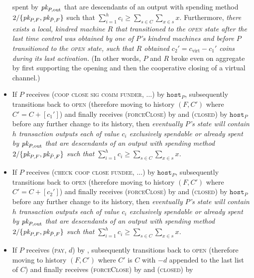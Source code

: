 \begin{itemize}
{    spent by $\textit{pk}_{P, \mathrm{out}}$ that are descendants of an output with
    spending method $2/\{\textit{pk}_{P, F}, \textit{pk}_{\bar{P}, F}\}$ such that
    $\sum\limits_{i=1}^h c_i \geq \sum\limits_{s \in C} \sum\limits_{x \in s}
    x$.} Furthermore, \emph{there exists a local, kindred machine $R$ that
    transitioned to the \textsc{open} state after the last time control was
    obtained by one of $P$'s kindred machines and before $P$ transitioned to the
    \textsc{open} state, such that $R$ obtained $c_2' = c_{\mathrm{virt}} -
    c_1'$ coins during its last activation.} (In other words, $P$ and $R$ broke
    even on aggregate by first supporting the opening and then the cooperative
    closing of a virtual channel.)
    \item If $P$ receives (\textsc{coop close sig comm funder}, $\dots$) by
    $\texttt{host}_P$, subsequently transitions back to \textsc{open} (therefore
    moving to history $(F, C')$ where $C' = C + [c_1']$) and finally receives
    (\textsc{forceClose}) by \environment and (\textsc{closed}) by
    $\texttt{host}_P$ before any further change to its history, then
    \emph{eventually $P$'s \ledger state will contain $h$ transaction outputs
    each of value $c_i$ exclusively spendable or already spent by $\textit{pk}_{P,
    \mathrm{out}}$ that are descendants of an output with spending method
    $2/\{\textit{pk}_{P, F}, \textit{pk}_{\bar{P}, F}\}$ such that $\sum\limits_{i=1}^h c_i \geq
    \sum\limits_{s \in C} \sum\limits_{x \in s} x$.}
    \item If $P$ receives (\textsc{check coop close fundee}, $\dots$) by
    $\texttt{host}_P$, subsequently transitions back to \textsc{open} (therefore
    moving to history $(F, C')$ where $C' = C + [c_2']$) and finally receives
    (\textsc{forceClose}) by \environment and (\textsc{closed}) by
    $\texttt{host}_P$ before any further change to its history, then
    \emph{eventually $P$'s \ledger state will contain $h$ transaction outputs
    each of value $c_i$ exclusively spendable or already spent by $\textit{pk}_{P,
    \mathrm{out}}$ that are descendants of an output with spending method
    $2/\{\textit{pk}_{P, F}, \textit{pk}_{\bar{P}, F}\}$ such that $\sum\limits_{i=1}^h c_i \geq
    \sum\limits_{s \in C} \sum\limits_{x \in s} x$.}
    \item If $P$ receives (\textsc{pay}, $d$) by \environment, subsequently
    transitions back to \textsc{open} (therefore moving to history $(F, C')$
    where $C'$ is $C$ with $-d$ appended to the last list of $C$) and finally
    receives (\textsc{forceClose}) by \environment and (\textsc{closed}) by

\end{itemize}
